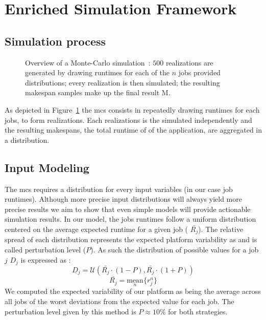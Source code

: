 \documentclass[10pt,conference,compsocconf]{IEEEtran}
\begin{document}
\section{Enriched Simulation Framework}\label{sec:enriched-sim}

\subsection{Simulation process}
\begin{figure}
	\centering
	\resizebox{0.9\linewidth}{!}{%
		
		}
\caption{Overview of a Monte-Carlo simulation~: $500$ realizations are generated
by drawing runtimes for each of the $n$ jobs provided distributions; every realization is
then simulated; the resulting makespan samples make up the final result M.}\label{fig:mc-process}
\end{figure}

As depicted in Figure~\ref{fig:mc-process} the \ac{mcs} consists in repeatedly
drawing runtimes for each jobs, to form realizations. Each realizations is the
simulated independently and the resulting makespans, the total runtime of of the
application, are aggregated in a distribution. 

\subsection{Input Modeling}\label{sec:im}
The \ac{mcs} requires a distribution for every input variables (in our case job
runtimes). Although more precise input distributions will always yield more
precise results we aim to show that even simple models will provide actionable
simulation results. In our model, the jobs runtimes follow a uniform
distribution centered on the average expected runtime for a given job (
$\bar{R_j}$). The relative spread of each distribution represents the expected
platform variability as  and is called perturbation level ($P$). As such the
distribution of possible values for a job $j$ $D_j$ is expressed as :
\begin{equation}
	D_j=\mathcal{U}(\bar{R_j}\cdot{}(1-P), \bar{R_j}\cdot{}(1+P))
\end{equation}
\begin{equation}
	\bar{R_j} = \underset{n}{\textrm{mean}}\{r_j^n\}
\end{equation}
We computed the expected variability of our platform as being the average across
all jobs of the worst deviations from the expected value for each job. 
The perturbation level given by this method is $P\approx{}10\%$ for both
strategies.%
\end{document}
